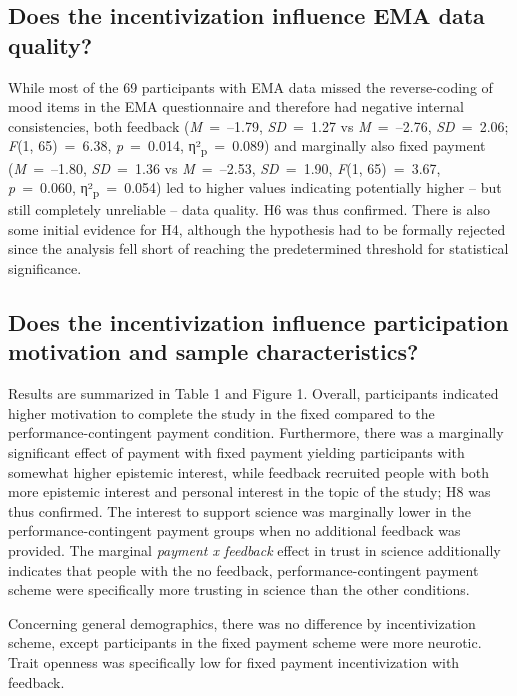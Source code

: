 \documentclass[authordate, empirical]{jote-new-article}
\begin{document}
	\subsection{Does the incentivization influence EMA data quality?}



	While most of the 69 participants with EMA data missed the reverse-coding of mood items in the EMA questionnaire and therefore had negative internal consistencies, both feedback (\emph{M }= --1.79, \emph{SD }= 1.27 vs \emph{M }= --2.76, \emph{SD }= 2.06; \emph{F}(1, 65) = 6.38, \emph{p} = 0.014, η²\textsubscript{p} = 0.089) and marginally also fixed payment (\emph{M }= --1.80, \emph{SD }= 1.36 vs \emph{M }= --2.53, \emph{SD }= 1.90, \emph{F}(1, 65) = 3.67, \emph{p} = 0.060, η²\textsubscript{p} = 0.054) led to higher values indicating potentially higher -- but still completely unreliable -- data quality. H6 was thus confirmed. There is also some initial evidence for H4, although the hypothesis had to be formally rejected since the analysis fell short of reaching the predetermined threshold for statistical significance.



	\subsection{Does the incentivization influence participation motivation and sample characteristics?}



	Results are summarized in Table 1 and Figure 1. Overall, participants indicated higher motivation to complete the study in the fixed compared to the performance-contingent payment condition. Furthermore, there was a marginally significant effect of payment with fixed payment yielding participants with somewhat higher epistemic interest, while feedback recruited people with both more epistemic interest and personal interest in the topic of the study; H8 was thus confirmed. The interest to support science was marginally lower in the performance-contingent payment groups when no additional feedback was provided. The marginal \emph{payment x feedback }effect in trust in science additionally indicates that people with the no feedback, performance-contingent payment scheme were specifically more trusting in science than the other conditions.



	Concerning general demographics, there was no difference by incentivization scheme, except participants in the fixed payment scheme were more neurotic. Trait openness was specifically low for fixed payment incentivization with feedback.
\end{document}
